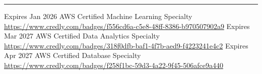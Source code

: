 \documentclass[9pt]{stackoverflow} %
\begin{document}
\textcolor{stackoverflow}{\hrule}
\vspace{4pt} %
\begin{tcolorbox}[blanker,width=0.75\textwidth,enlarge left by=0.25\textwidth,before skip=6pt,breakable,
	overlay unbroken and first={%
	  \node[inner sep=0pt,outer sep=0pt,text width=0.35\textwidth,
		align=none,
		below right]
		at ([xshift=-0.25\textwidth]frame.north west)
{
	\vspace{\baselineskip} %
	\cvsect{Certifications}
};}]
{\vspace{-16.3pt} %
	\small\begin{entrylist}
		\entry
			{Expires Jan 2026}
			{AWS Certified Machine Learning}
			{Specialty}
			{\href{https://www.credly.com/badges/f556cd6a-c5e8-48ff-8386-b970507902a9}{https://www.credly.com/badges/f556cd6a-c5e8-48ff-8386-b970507902a9}}
		\entry
			{Expires Mar 2027}
			{AWS Certified Data Analytics}
			{Specialty}
			{\href{https://www.credly.com/badges/318f0dfb-baf1-4f7b-aed9-f4223241e4c2}{https://www.credly.com/badges/318f0dfb-baf1-4f7b-aed9-f4223241e4c2}}
		\entry
			{Expires Apr 2027}
			{AWS Certified Database}
			{Specialty}
			{\href{https://www.credly.com/badges/f258f1bc-59d3-4a22-9f45-506afce9a440}{https://www.credly.com/badges/f258f1bc-59d3-4a22-9f45-506afce9a440}}
	\end{entrylist}}
\end{tcolorbox}
\end{document}
